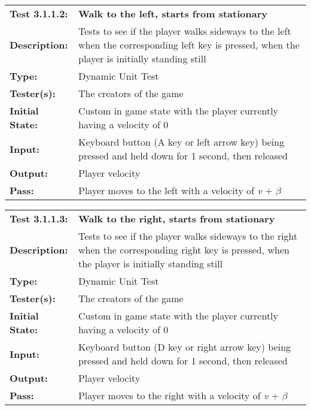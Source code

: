\documentclass[12pt, titlepage]{article}
\begin{document}
\begin{mdframed}[linewidth=1pt]
\begin{tabularx}{\textwidth}{@{}p{3cm}X@{}}
{\bf Test 3.1.1.2:} & {\bf Walk to the left, starts from stationary}\\[\baselineskip]
{\bf Description:} & Tests to see if the player walks sideways to the left when the corresponding left key is pressed, when the player is initially standing still\\[0.5\baselineskip]
{\bf Type:} & Dynamic Unit Test\\[0.5\baselineskip]
{\bf Tester(s):} & The creators of the game\\[0.5\baselineskip]
{\bf Initial State:} & Custom in game state with the player currently having a velocity of 0\\[0.5\baselineskip]
{\bf Input:} & Keyboard button (A key or left arrow key) being pressed and held down for 1 second, then released\\[0.5\baselineskip]
{\bf Output:} & Player velocity\\[0.5\baselineskip]
{\bf Pass:} & Player moves to the left with a velocity of \textit{v} + $\beta$
\end{tabularx}
\end{mdframed}

\begin{mdframed}[linewidth=1pt]
\begin{tabularx}{\textwidth}{@{}p{3cm}X@{}}
{\bf Test 3.1.1.3:} & {\bf Walk to the right, starts from stationary}\\[\baselineskip]
{\bf Description:} & Tests to see if the player walks sideways to the right when the corresponding right key is pressed, when the player is initially standing still\\[0.5\baselineskip]
{\bf Type:} & Dynamic Unit Test\\[0.5\baselineskip]
{\bf Tester(s):} & The creators of the game\\[0.5\baselineskip]
{\bf Initial State:} & Custom in game state with the player currently having a velocity of 0\\[0.5\baselineskip]
{\bf Input:} & Keyboard button (D key or right arrow key) being pressed and held down for 1 second, then released\\[0.5\baselineskip]
{\bf Output:} & Player velocity\\[0.5\baselineskip]
{\bf Pass:} & Player moves to the right with a velocity of \textit{v} + $\beta$
\end{tabularx}
\end{mdframed}
\end{document}
